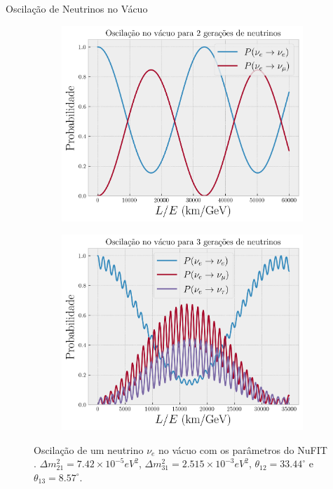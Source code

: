 \documentclass[aspectratio=169]{beamer}
\begin{document}
\begin{frame}{Oscilação de Neutrinos no Vácuo}

\begin{figure}[H]
\centering
\begin{subfigure}{.48\textwidth}
  \centering
  \includegraphics[width=\linewidth]{fig/2nu-vacuo-e.png}
  \label{fig:2nu-vacuo-e}
\end{subfigure}%
\quad
\begin{subfigure}{.48\textwidth}
  \centering
  \includegraphics[width=\linewidth]{fig/3nu-vacuo-e.png}
  \label{fig:3nu-vacuo-e}
\end{subfigure}
\caption{Oscilação de um neutrino $\nu_e$ no vácuo com os parâmetros do NuFIT \cite{nufit}. $\Delta m_{21}^2 = 7.42 \times 10^{-5} \unit{eV^2}$, $\Delta m_{31}^2 = 2.515 \times 10^{-3} \unit{eV^2}$, $\theta_{12} = 33.44^\circ$ e $\theta_{13} = 8.57^\circ$.}
\label{fig:vacuo_electron}
\end{figure}

\end{frame}
\end{document}
